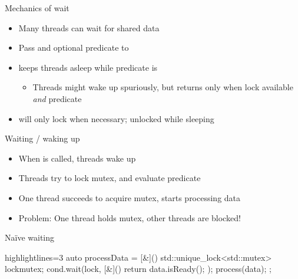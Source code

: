 \begin{frame}[fragile]
  \vspace{-1.2\baselineskip}
  \begin{overprint}
  \begin{block}{Mechanics of wait}
    \begin{itemize}
      \item Many threads can wait for shared data
      \item Pass  and optional predicate to 
      \item {} keeps threads asleep while predicate is 
      \begin{itemize}
        \item Threads might wake up spuriously, but  returns only when lock available \emph{and} predicate 
      \end{itemize}
      \item {} will only lock when necessary; unlocked while sleeping
    \end{itemize}
  \end{block}
  \begin{block}{Waiting / waking up}
    \begin{itemize}
      \item When  is called, threads wake up
      \item Threads try to lock mutex, and evaluate predicate
      \item One thread succeeds to acquire mutex, starts processing data
      \item {\color{red} Problem}: One thread holds mutex, other threads are blocked!
    \end{itemize}
  \end{block}
  \end{overprint}

  \begin{alertblock}{Na\"ive waiting}
    \begin{cppcode*}{highlightlines=3}
      auto processData = [&](){
        std::unique_lock<std::mutex> lock{mutex};
        cond.wait(lock, [&](){ return data.isReady(); });
        process(data);
      };
    \end{cppcode*}
  \end{alertblock}
\end{frame}

